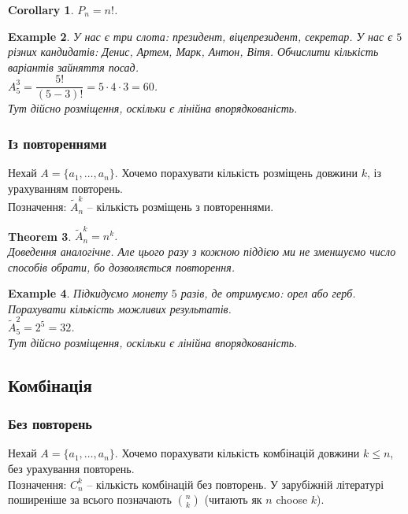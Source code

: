 \documentclass[a4paper, 14pt]{extarticle}
\theoremstyle{theoremdd}
\newtheorem{theorem}{Theorem}[subsection]
\theoremstyle{theoremdd}
\theoremstyle{theoremdd}
\theoremstyle{theoremdd}
\theoremstyle{theoremdd}
\newtheorem{example}[theorem]{Example}
\theoremstyle{theoremdd}
\theoremstyle{theoremdd}
\theoremstyle{theoremdd}
\theoremstyle{theoremdd}
\theoremstyle{theoremdd}
\theoremstyle{theoremdd}
\theoremstyle{theoremdd}
\theoremstyle{theoremdd}
\theoremstyle{theoremdd}
\newtheorem{corollary}[theorem]{Corollary}
\theoremstyle{theoremdd}
\begin{document}
\begin{corollary}
$P_n = n!$.
\end{corollary}

\begin{example}
У нас є три слота: президент, віцепрезидент, секретар. У нас є $5$ різних кандидатів: Денис, Артем, Марк, Антон, Вітя. Обчислити кількість варіантів зайняття посад.\\
$A_5^3 = \dfrac{5!}{(5-3)!} = 5 \cdot 4 \cdot 3 = 60$.
\bigskip \\
Тут дійсно розміщення, оскільки є лінійна впорядкованість.
\end{example}

\subsubsection*{Із повтореннями}
Нехай $A = \{a_1,\dots,a_n\}$. Хочемо порахувати кількість розміщень довжини $k$, із урахуванням повторень.\\
Позначення: $\tilde{A}_n^k$ -- кількість розміщень з повтореннями.

\begin{theorem}
$\tilde{A}_n^k = n^k$.\\
\textit{Доведення аналогічне. Але цього разу з кожною піддією ми не зменшуємо число способів обрати, бо дозволяється повторення.}
\end{theorem}

\begin{example}
Підкидуємо монету $5$ разів, де отримуємо: орел або герб. Порахувати кількість можливих результатів.\\
$\tilde{A}_5^2 = 2^5 = 32$.
\bigskip \\
Тут дійсно розміщення, оскільки є лінійна впорядкованість.
\end{example}

\subsection{Комбінація}
\subsubsection*{Без повторень}
Нехай $A = \{a_1,\dots,a_n\}$. Хочемо порахувати кількість комбінацій довжини $k \leq n$, без урахування повторень.\\
Позначення: $C_n^k$ -- кількість комбінацій без повторень. У зарубіжній літературі поширеніше за всього позначають $\binom{n}{k}$ (читають як $n$ choose $k$).
\end{document}
